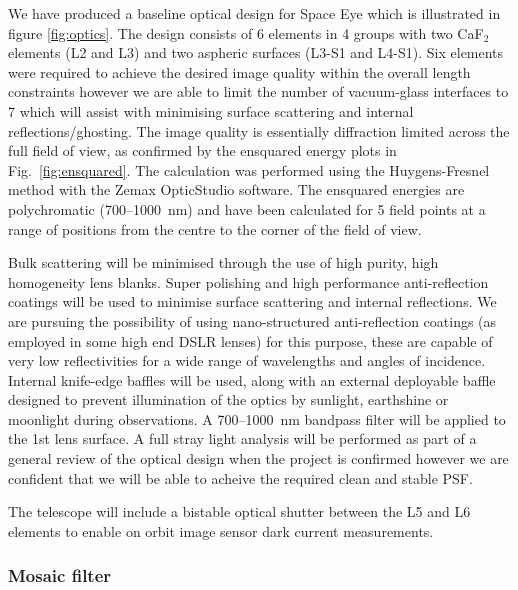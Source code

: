 \documentclass[]{iac}
\begin{document}
We have produced a baseline optical design for Space Eye which is illustrated in figure \ref{fig:optics}. The design
consists of 6 elements in 4 groups with two CaF$_2$ elements (L2 and L3) and two aspheric surfaces (L3-S1 and L4-S1).
Six elements were required to achieve the desired image quality within the overall length constraints however we are
able to limit the number of vacuum-glass interfaces to 7 which will assist with minimising surface scattering and
internal reflections/ghosting. The image quality is essentially diffraction limited across the full field of view, as
confirmed by the ensquared energy plots in Fig.~\ref{fig:ensquared}. The calculation was performed using the
Huygens-Fresnel method with the Zemax OpticStudio software. The ensquared energies are polychromatic
(700--\SI{1000}{\nano\metre}) and have been calculated for 5 field points at a range of positions from the centre to the
corner of the field of view.

Bulk scattering will be minimised through the use of high purity, high homogeneity lens blanks. Super polishing and high
performance anti-reflection coatings will be used to minimise surface scattering and internal reflections. We are
pursuing the possibility of using nano-structured anti-reflection coatings (as employed in some high end DSLR lenses)
for this purpose, these are capable of very low reflectivities for a wide range of wavelengths and angles of incidence.
Internal knife-edge baffles will be used, along with an external deployable baffle designed to prevent illumination of
the optics by sunlight, earthshine or moonlight during observations. A 700--\SI{1000}{\nano\metre} bandpass filter will
be applied to the 1st lens surface. A full stray light analysis will be performed as part of a general review of the
optical design when the project is confirmed however we are confident that we will be able to acheive the required clean
and stable PSF.

The telescope will include a bistable optical shutter between the L5 and L6 elements to enable on orbit image sensor
dark current measurements.

\subsubsection{Mosaic filter}
\label{sec:mosaic}
\end{document}
